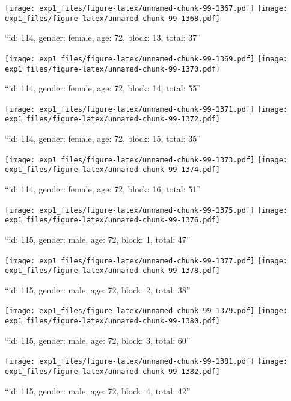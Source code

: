 \documentclass[,]{article}
\begin{document}
\texttt{[image: exp1\_files/figure-latex/unnamed-chunk-99-1367.pdf]}
\texttt{[image: exp1\_files/figure-latex/unnamed-chunk-99-1368.pdf]}

\newpage
[1] 

``id: 114, gender: female, age: 72, block: 13, total: 37''

\texttt{[image: exp1\_files/figure-latex/unnamed-chunk-99-1369.pdf]}
\texttt{[image: exp1\_files/figure-latex/unnamed-chunk-99-1370.pdf]}

\newpage
[1] 

``id: 114, gender: female, age: 72, block: 14, total: 55''

\texttt{[image: exp1\_files/figure-latex/unnamed-chunk-99-1371.pdf]}
\texttt{[image: exp1\_files/figure-latex/unnamed-chunk-99-1372.pdf]}

\newpage
[1] 

``id: 114, gender: female, age: 72, block: 15, total: 35''

\texttt{[image: exp1\_files/figure-latex/unnamed-chunk-99-1373.pdf]}
\texttt{[image: exp1\_files/figure-latex/unnamed-chunk-99-1374.pdf]}

\newpage
[1] 

``id: 114, gender: female, age: 72, block: 16, total: 51''

\texttt{[image: exp1\_files/figure-latex/unnamed-chunk-99-1375.pdf]}
\texttt{[image: exp1\_files/figure-latex/unnamed-chunk-99-1376.pdf]}

\newpage
[1] 

``id: 115, gender: male, age: 72, block: 1, total: 47''

\texttt{[image: exp1\_files/figure-latex/unnamed-chunk-99-1377.pdf]}
\texttt{[image: exp1\_files/figure-latex/unnamed-chunk-99-1378.pdf]}

\newpage
[1] 

``id: 115, gender: male, age: 72, block: 2, total: 38''

\texttt{[image: exp1\_files/figure-latex/unnamed-chunk-99-1379.pdf]}
\texttt{[image: exp1\_files/figure-latex/unnamed-chunk-99-1380.pdf]}

\newpage
[1] 

``id: 115, gender: male, age: 72, block: 3, total: 60''

\texttt{[image: exp1\_files/figure-latex/unnamed-chunk-99-1381.pdf]}
\texttt{[image: exp1\_files/figure-latex/unnamed-chunk-99-1382.pdf]}

\newpage
[1] 

``id: 115, gender: male, age: 72, block: 4, total: 42''
\end{document}
